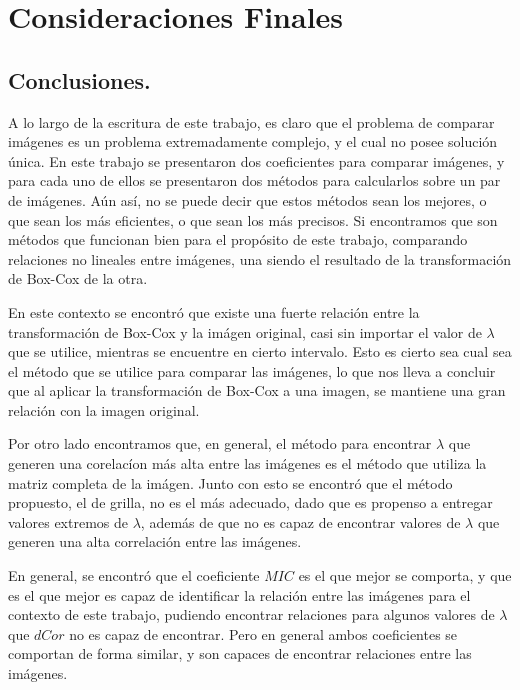 \chapter{Consideraciones Finales}\label{chap6}

\section{Conclusiones.}


    A lo largo de la escritura de este trabajo, es claro que el problema de comparar im\'agenes es un problema extremadamente complejo, y el cual no posee soluci\'on \'unica. En este trabajo se presentaron dos coeficientes para comparar im\'agenes, y para cada uno de ellos se presentaron dos m\'etodos para calcularlos sobre un par de im\'agenes. A\'un as\'i, no se puede decir que estos m\'etodos sean los mejores, o que sean los m\'as eficientes, o que sean los m\'as precisos. Si encontramos que son m\'etodos que funcionan bien para el prop\'osito de este trabajo, comparando relaciones no lineales entre im\'agenes, una siendo el resultado de la transformaci\'on de Box-Cox de la otra.

    En este contexto se encontr\'o que existe una fuerte relaci\'on entre la transformaci\'on de Box-Cox y la im\'agen original, casi sin importar el valor de $\lambda$ que se utilice, mientras se encuentre en cierto intervalo. Esto es cierto sea cual sea el m\'etodo que se utilice para comparar las im\'agenes, lo que nos lleva a concluir que al aplicar la transformaci\'on de Box-Cox a una imagen, se mantiene una gran relaci\'on con la imagen original.

    Por otro lado encontramos que, en general, el m\'etodo para encontrar $\lambda$ que generen una corelac\'ion m\'as alta entre las im\'agenes es el m\'etodo que utiliza la matriz completa de la im\'agen. Junto con esto se encontr\'o que el m\'etodo propuesto, el de grilla, no es el m\'as adecuado, dado que es propenso a entregar valores extremos de $\lambda$, además de que no es capaz de encontrar valores de $\lambda$ que generen una alta correlaci\'on entre las im\'agenes.

    En general, se encontr\'o que el coeficiente $MIC$ es el que mejor se comporta, y que es el que mejor es capaz de identificar la relaci\'on entre las im\'agenes para el contexto de este trabajo, pudiendo encontrar relaciones para algunos valores de $\lambda$ que $dCor$ no es capaz de encontrar. Pero en general ambos coeficientes se comportan de forma similar, y son capaces de encontrar relaciones entre las im\'agenes.


